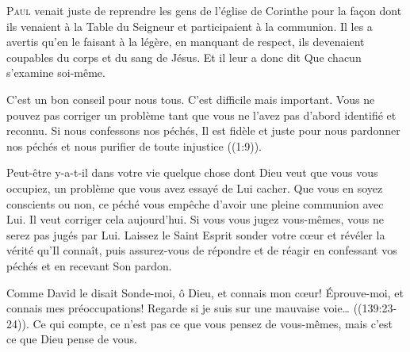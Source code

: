 


\lettrine{P}{aul} venait juste de reprendre
 les gens de l'église de  Corinthe
 pour la fa\c{c}on dont ils venaient à la Table du Seigneur
 et participaient à la communion.
 Il les a avertis qu'en le faisant à la légère,
 en manquant de respect, ils devenaient coupables
 du corps et du sang de Jésus.
 Et il leur a donc dit\frcolon{} 
 \Og Que chacun s'examine soi-même. \Fg{}

C'est un bon conseil pour nous tous. C'est difficile mais important.
 Vous ne pouvez pas corriger un problème tant que vous ne l'avez pas
 d'abord identifié et reconnu.
 \Og Si nous confessons nos péchés, Il est fidèle et juste
 pour nous pardonner nos péchés et nous purifier
 de toute injustice \Fg{} ((1:9)).


Peut-être y-a-t-il dans votre vie quelque chose dont Dieu
 veut que vous vous occupiez, un problème que vous avez essayé
 de Lui cacher.
 Que vous en soyez conscients ou non,
 ce péché vous empêche d'avoir une pleine communion avec Lui.
 Il veut corriger cela aujourd'hui.
 Si vous vous jugez vous-mêmes, vous ne serez pas jugés par Lui.
 Laissez le Saint Esprit sonder votre c\oe{}ur et révéler la vérité
 qu'Il connaît, puis assurez-vous de répondre et de réagir
 en confessant vos péchés et en recevant Son pardon.

Comme David le disait\frcolon{} 
 \Og Sonde-moi, ô Dieu, et connais mon c\oe{}ur!
 Éprouve-moi, et connais mes préoccupations!
 Regarde si je suis sur une mauvaise voie\dots{} \Fg{}
 ((139:23-24)).
 Ce qui compte, ce n'est pas ce que vous pensez de vous-mêmes,
 mais c'est ce que Dieu pense de vous.

\dvrule





